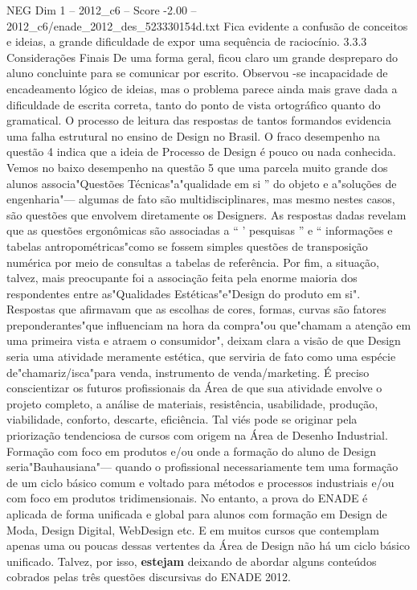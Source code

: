 \begin{textsample}{NEG Dim 1 – 2012\_c6 – Score -2.00 – 2012\_c6/enade\_2012\_des\_523330154d.txt}
Fica evidente a confusão de conceitos e ideias, a grande dificuldade de expor uma sequência de raciocínio. 3.3.3 Considerações Finais De uma forma geral, ficou claro um grande despreparo do aluno concluinte para se comunicar por escrito.
Observou -se incapacidade de encadeamento lógico de ideias, mas o problema parece ainda mais grave dada a dificuldade de escrita correta, tanto do ponto de vista ortográfico quanto do gramatical.
O processo de leitura das respostas de tantos formandos evidencia uma falha estrutural no ensino de Design no Brasil.
O fraco desempenho na questão 4 indica que a ideia de Processo de Design é pouco ou nada conhecida.
Vemos no baixo desempenho na questão 5 que uma parcela muito grande dos alunos associa"Questões Técnicas"a"qualidade em si ” do objeto e a"soluções de engenharia"— algumas de fato são multidisciplinares, mas mesmo nestes casos, são questões que envolvem diretamente os Designers.
As respostas dadas revelam que as questões ergonômicas são associadas a “ ' pesquisas ” e “ informações e tabelas antropométricas"como se fossem simples questões de transposição numérica por meio de consultas a tabelas de referência.
Por fim, a situação, talvez, mais preocupante foi a associação feita pela enorme maioria dos respondentes entre as"Qualidades Estéticas"e"Design do produto em si".
Respostas que afirmavam que as escolhas de cores, formas, curvas são fatores preponderantes"que influenciam na hora da compra"ou que"chamam a atenção em uma primeira vista e atraem o consumidor", deixam clara a visão de que Design seria uma atividade meramente estética, que serviria de fato como uma espécie de"chamariz/isca"para venda, instrumento de venda/marketing.
É preciso conscientizar os futuros profissionais da Área de que sua atividade envolve o projeto completo, a análise de materiais, resistência, usabilidade, produção, viabilidade, conforto, descarte, eficiência.
Tal viés pode se originar pela priorização tendenciosa de cursos com origem na Área de Desenho Industrial.
Formação com foco em produtos e/ou onde a formação do aluno de Design seria"Bauhausiana"— quando o profissional necessariamente tem uma formação de um ciclo básico comum e voltado para métodos e processos industriais e/ou com foco em produtos tridimensionais.
No entanto, a prova do ENADE é aplicada de forma unificada e global para alunos com formação em Design de Moda, Design Digital, WebDesign etc.
E em muitos cursos que contemplam apenas uma ou poucas dessas vertentes da Área de Design não há um ciclo básico unificado.
Talvez, por isso, \textbf{estejam} deixando de abordar alguns conteúdos cobrados pelas três questões discursivas do ENADE 2012.

\end{textsample}
